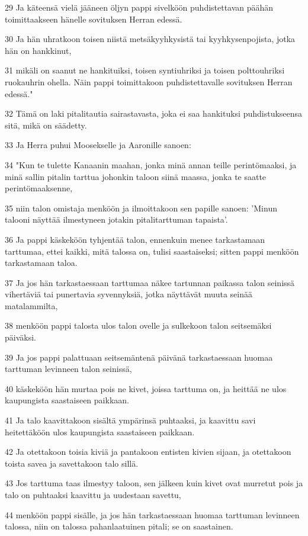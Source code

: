 \par 29 Ja käteensä vielä jääneen öljyn pappi sivelköön puhdistettavan päähän toimittaakseen hänelle sovituksen Herran edessä.
\par 30 Ja hän uhratkoon toisen niistä metsäkyyhkysistä tai kyyhkysenpojista, jotka hän on hankkinut,
\par 31 mikäli on saanut ne hankituiksi, toisen syntiuhriksi ja toisen polttouhriksi ruokauhrin ohella. Näin pappi toimittakoon puhdistettavalle sovituksen Herran edessä."
\par 32 Tämä on laki pitalitautia sairastavasta, joka ei saa hankituksi puhdistukseensa sitä, mikä on säädetty.
\par 33 Ja Herra puhui Moosekselle ja Aaronille sanoen:
\par 34 "Kun te tulette Kanaanin maahan, jonka minä annan teille perintömaaksi, ja minä sallin pitalin tarttua johonkin taloon siinä maassa, jonka te saatte perintömaaksenne,
\par 35 niin talon omistaja menköön ja ilmoittakoon sen papille sanoen: 'Minun talooni näyttää ilmestyneen jotakin pitalitarttuman tapaista'.
\par 36 Ja pappi käskeköön tyhjentää talon, ennenkuin menee tarkastamaan tarttumaa, ettei kaikki, mitä talossa on, tulisi saastaiseksi; sitten pappi menköön tarkastamaan taloa.
\par 37 Ja jos hän tarkastaessaan tarttumaa näkee tartunnan paikassa talon seinissä vihertäviä tai punertavia syvennyksiä, jotka näyttävät muuta seinää matalammilta,
\par 38 menköön pappi talosta ulos talon ovelle ja sulkekoon talon seitsemäksi päiväksi.
\par 39 Ja jos pappi palattuaan seitsemäntenä päivänä tarkastaessaan huomaa tarttuman levinneen talon seinissä,
\par 40 käskeköön hän murtaa pois ne kivet, joissa tarttuma on, ja heittää ne ulos kaupungista saastaiseen paikkaan.
\par 41 Ja talo kaavittakoon sisältä ympärinsä puhtaaksi, ja kaavittu savi heitettäköön ulos kaupungista saastaiseen paikkaan.
\par 42 Ja otettakoon toisia kiviä ja pantakoon entisten kivien sijaan, ja otettakoon toista savea ja savettakoon talo sillä.
\par 43 Jos tarttuma taas ilmestyy taloon, sen jälkeen kuin kivet ovat murretut pois ja talo on puhtaaksi kaavittu ja uudestaan savettu,
\par 44 menköön pappi sisälle, ja jos hän tarkastaessaan huomaa tarttuman levinneen talossa, niin on talossa pahanlaatuinen pitali; se on saastainen.
